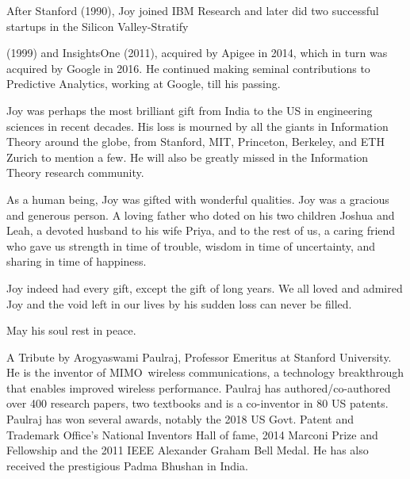 \begin{multicols}{2}
\vspace{-.1cm}

After Stanford (1990), Joy joined IBM Research and later did two successful startups in the Silicon Valley-Stratify 

\noindent
(1999) and InsightsOne (2011), acquired by Apigee in 2014, which in turn was acquired by Google in 2016. He continued making seminal contributions to Predictive Analytics, working at Google, till his passing.


Joy was perhaps the most brilliant gift from India to the US in engineering sciences in recent decades. His loss is mourned by all the giants in Information Theory around the globe, from Stanford, MIT, Princeton, Berkeley, and ETH Zurich to mention a few. He will also be greatly missed in the Information Theory research community.


As a human being, Joy was gifted with wonderful qualities. Joy was a gracious and generous person. A loving father who doted on his two children Joshua and Leah, a devoted husband to his wife Priya, and to the rest of us,  a caring friend who gave us strength in time of trouble, wisdom in time of uncertainty, and sharing in time of happiness. 


Joy indeed had every gift, except the gift of long years. We all loved and admired Joy and the void left in our lives by his sudden loss can never be filled.

May his soul rest in peace.

A Tribute by Arogyaswami Paulraj, Professor Emeritus at Stanford University. He is the inventor of MIMO~wireless communications, a technology breakthrough that enables improved wireless performance. Paulraj has authored/co-authored over 400 research papers, two textbooks and is a co-inventor in 80 US patents. Paulraj has won several awards, notably the 2018 US Govt. Patent and Trademark Office’s National Inventors Hall of fame, 2014 Marconi Prize and Fellowship and the 2011 IEEE Alexander Graham Bell Medal. He has also received the prestigious Padma Bhushan in India. 

\end{multicols}


